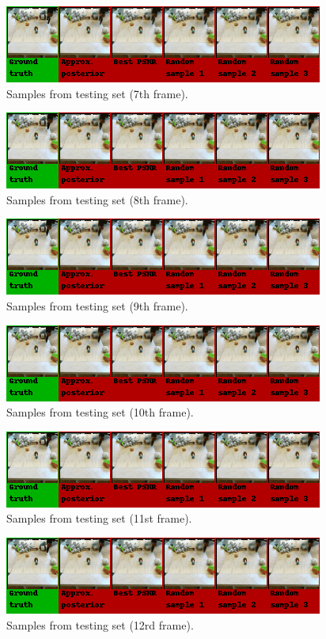    \begin{figure}[H]
        \centering
        \includegraphics[scale=0.9]{img/test_pred-6.png}
        \caption{Samples from testing set (7th frame).}
    \end{figure}
    \begin{figure}[H]
        \centering
        \includegraphics[scale=0.9]{img/test_pred-7.png}
        \caption{Samples from testing set (8th frame).}
    \end{figure}
    \begin{figure}[H]
        \centering
        \includegraphics[scale=0.9]{img/test_pred-8.png}
        \caption{Samples from testing set (9th frame).}
    \end{figure}
    \begin{figure}[H]
        \centering
        \includegraphics[scale=0.9]{img/test_pred-9.png}
        \caption{Samples from testing set (10th frame).}
    \end{figure}
    \begin{figure}[H]
        \centering
        \includegraphics[scale=0.9]{img/test_pred-10.png}
        \caption{Samples from testing set (11st frame).}
    \end{figure}
    \begin{figure}[H]
        \centering
        \includegraphics[scale=0.9]{img/test_pred-11.png}
        \caption{Samples from testing set (12rd frame).}
    \end{figure}

